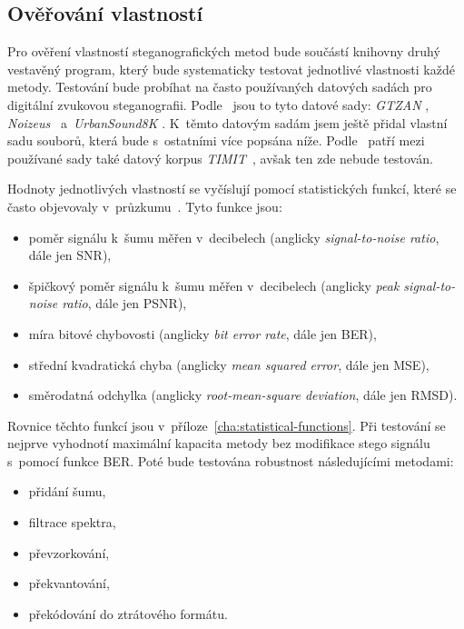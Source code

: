 \subsection*{Ověřování vlastností}
\label{sub:method-property-verification}

Pro ověření vlastností steganografických metod bude součástí knihovny druhý
vestavěný program, který bude systematicky testovat jednotlivé vlastnosti každé
metody. Testování bude probíhat na často používaných datových sadách pro
digitální zvukovou steganografii. Podle~\cite{AlSabhany2020} jsou to tyto
datové sady: \textit{GTZAN} \cite{Tzanetakis2001},
\textit{Noizeus}~\cite{Hu2006} a~\textit{UrbanSound8K} \cite{Salamon2014}.
K~těmto datovým sadám jsem ještě přidal vlastní sadu souborů, která bude
s~ostatními více popsána níže.
Podle~\cite{AlSabhany2020} patří mezi používané sady také datový korpus
\textit{TIMIT}~\cite{Garofolo1993}, avšak ten zde nebude testován.

Hodnoty jednotlivých vlastností se vyčíslují pomocí statistických funkcí, které
se často objevovaly v~průzkumu~\cite{AlSabhany2020}. Tyto funkce jsou:

\begin{itemize}
    \item poměr signálu k~šumu měřen v~decibelech (anglicky
        \textit{signal-to-noise ratio}, dále jen SNR),
    \item špičkový poměr signálu k~šumu měřen v~decibelech (anglicky
        \textit{peak signal-to-noise ratio}, dále jen PSNR),
    \item míra bitové chybovosti (anglicky \textit{bit error rate}, dále jen
        BER),
    \item střední kvadratická chyba (anglicky \textit{mean squared error}, dále
        jen MSE),
    \item směrodatná odchylka (anglicky \textit{root-mean-square deviation},
        dále jen RMSD).
\end{itemize}

\noindent Rovnice těchto funkcí jsou v~příloze~\ref{cha:statistical-functions}.
Při testování se nejprve vyhodnotí maximální kapacita metody bez modifikace
stego signálu s~pomocí funkce BER. Poté bude testována robustnost následujícími
metodami:

\begin{itemize}
    \item přidání šumu,
    \item filtrace spektra,
    \item převzorkování,
    \item překvantování,
    \item překódování do ztrátového formátu.
\end{itemize}

